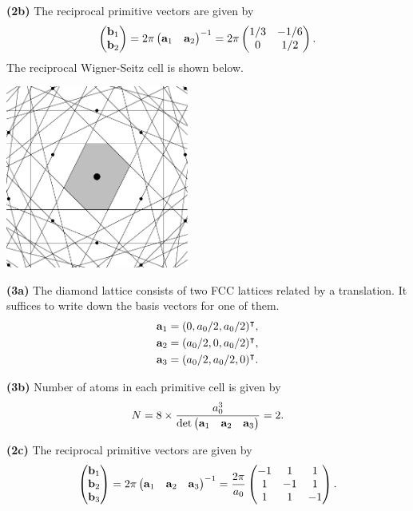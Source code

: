 \documentclass{article}
\makeatletter
\newcommand*{\shifttext}[1]{%
  \settowidth{\@tempdima}{#1}%
  \hspace{-\@tempdima}#1%
}
\newcommand{\plabel}[1]{%
\shifttext{\textbf{#1}\quad}%
}
\makeatother
\begin{document}
\plabel{(2b)}%
The reciprocal primitive vectors are given by
\[ \begin{pmatrix}
    \vb{b}_1 \\
    \vb{b}_2
\end{pmatrix} = 2\pi \begin{pmatrix}
    \vb{a}_1 & \vb{a}_2
\end{pmatrix}^{-1} = 2\pi \begin{pmatrix}
    1/3 & -1/6 \\
    0 & 1/2
\end{pmatrix}. \]
The reciprocal Wigner-Seitz cell is shown below.
\begin{center}
    \includegraphics[width=6cm]{img/1.2a.BZWS/main.pdf}
\end{center}

\plabel{(3a)}%
The diamond lattice consists of two FCC lattices related by a translation.
It suffices to write down the basis vectors for one of them.
\begin{align*}
    \vb{a}_1 &= (0,a_0/2,a_0/2)^\intercal, \\
    \vb{a}_2 &= (a_0/2,0,a_0/2)^\intercal, \\ 
    \vb{a}_3 &= (a_0/2,a_0/2,0)^\intercal.
\end{align*}

\plabel{(3b)}%
Number of atoms in each primitive cell is given by
\[ N = 8\times \frac{a_0^3}{\det \begin{pmatrix}
    \vb{a}_1 & \vb{a}_2 & \vb{a}_3
\end{pmatrix}} = 2. \]

\plabel{(2c)}%
The reciprocal primitive vectors are given by
\[ \begin{pmatrix}
    \vb{b}_1 \\
    \vb{b}_2 \\
    \vb{b}_3
\end{pmatrix} = 2\pi \begin{pmatrix}
    \vb{a}_1 & \vb{a}_2 & \vb{a}_3
\end{pmatrix}^{-1} = \frac{2\pi}{a_0} \begin{pmatrix}
    -1 & 1 & 1 \\
    1 & -1 & 1 \\
    1 & 1 & -1
\end{pmatrix}. \]
\end{document}
